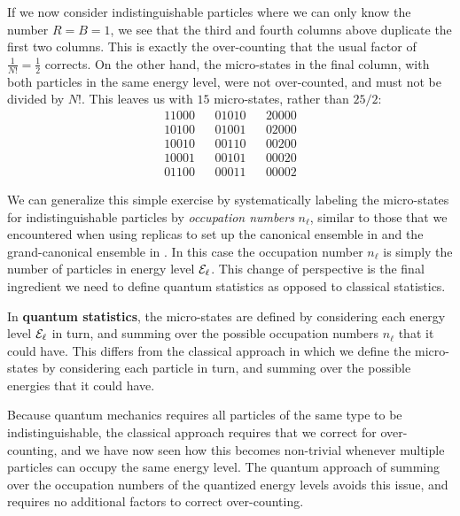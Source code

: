 If we now consider indistinguishable particles where we can only know the number $R = B = 1$, we see that the third and fourth columns above duplicate the first two columns.
This is exactly the over-counting that the usual factor of $\frac{1}{N!} = \frac{1}{2}$ corrects.
On the other hand, the micro-states in the final column, with both particles in the same energy level, were not over-counted, and must not be divided by $N!$.
This leaves us with $15$ micro-states, rather than $25/2$:
\begin{align*}
  11000 & & 01010 & & 20000 \\
  10100 & & 01001 & & 02000 \\
  10010 & & 00110 & & 00200 \\
  10001 & & 00101 & & 00020 \\
  01100 & & 00011 & & 00002
\end{align*}

We can generalize this simple exercise by systematically labeling the micro-states for indistinguishable particles by \textit{occupation numbers} $n_{\ell}$, similar to those that we encountered when using replicas to set up the canonical ensemble in  and the grand-canonical ensemble in .
In this case the occupation number $n_{\ell}$ is simply the number of particles in energy level $\mathcal E_{\ell}$.
This change of perspective is the final ingredient we need to define quantum statistics as opposed to classical statistics.

\begin{shaded}
  In \textbf{quantum statistics}, the micro-states are defined by considering each energy level $\mathcal E_{\ell}$ in turn, and summing over the possible occupation numbers $n_{\ell}$ that it could have.
  This differs from the classical approach in which we define the micro-states by considering each particle in turn, and summing over the possible energies that it could have.
\end{shaded}

Because quantum mechanics requires all particles of the same type to be indistinguishable, the classical approach requires that we correct for over-counting, and we have now seen how this becomes non-trivial whenever multiple particles can occupy the same energy level.
The quantum approach of summing over the occupation numbers of the quantized energy levels avoids this issue, and requires no additional factors to correct over-counting.




